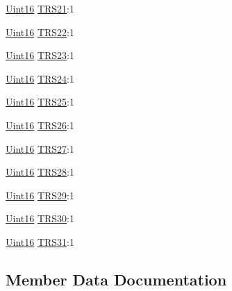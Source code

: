 \begin{DoxyCompactItemize}
\hyperlink{_d_s_p2833x___device_8h_a59a9f6be4562c327cbfb4f7e8e18f08b}{Uint16} \hyperlink{struct_c_a_n_t_r_s___b_i_t_s_a932a55c736eb8750eaab4062033aad9a}{T\+R\+S21}\+:1
\item 
\hyperlink{_d_s_p2833x___device_8h_a59a9f6be4562c327cbfb4f7e8e18f08b}{Uint16} \hyperlink{struct_c_a_n_t_r_s___b_i_t_s_aa69bfd255f8dc8a6313e5ab23f4b0dd9}{T\+R\+S22}\+:1
\item 
\hyperlink{_d_s_p2833x___device_8h_a59a9f6be4562c327cbfb4f7e8e18f08b}{Uint16} \hyperlink{struct_c_a_n_t_r_s___b_i_t_s_adc34f962ed50e72ec6b273cd4459cc97}{T\+R\+S23}\+:1
\item 
\hyperlink{_d_s_p2833x___device_8h_a59a9f6be4562c327cbfb4f7e8e18f08b}{Uint16} \hyperlink{struct_c_a_n_t_r_s___b_i_t_s_af81847694b5978680c72134c3ed895fb}{T\+R\+S24}\+:1
\item 
\hyperlink{_d_s_p2833x___device_8h_a59a9f6be4562c327cbfb4f7e8e18f08b}{Uint16} \hyperlink{struct_c_a_n_t_r_s___b_i_t_s_a3275ffc138b403bd683b2392a4cd89fc}{T\+R\+S25}\+:1
\item 
\hyperlink{_d_s_p2833x___device_8h_a59a9f6be4562c327cbfb4f7e8e18f08b}{Uint16} \hyperlink{struct_c_a_n_t_r_s___b_i_t_s_aebb14105fd0d23e6269c9a50606d2718}{T\+R\+S26}\+:1
\item 
\hyperlink{_d_s_p2833x___device_8h_a59a9f6be4562c327cbfb4f7e8e18f08b}{Uint16} \hyperlink{struct_c_a_n_t_r_s___b_i_t_s_ad1c32744b60f7e9fbdf845e333713246}{T\+R\+S27}\+:1
\item 
\hyperlink{_d_s_p2833x___device_8h_a59a9f6be4562c327cbfb4f7e8e18f08b}{Uint16} \hyperlink{struct_c_a_n_t_r_s___b_i_t_s_a9aabf1a417755368977f9c814aaa8e7f}{T\+R\+S28}\+:1
\item 
\hyperlink{_d_s_p2833x___device_8h_a59a9f6be4562c327cbfb4f7e8e18f08b}{Uint16} \hyperlink{struct_c_a_n_t_r_s___b_i_t_s_aa6bc136e2690058f4915cad1c32be876}{T\+R\+S29}\+:1
\item 
\hyperlink{_d_s_p2833x___device_8h_a59a9f6be4562c327cbfb4f7e8e18f08b}{Uint16} \hyperlink{struct_c_a_n_t_r_s___b_i_t_s_a6e05e64027351624a1cc1dda05819732}{T\+R\+S30}\+:1
\item 
\hyperlink{_d_s_p2833x___device_8h_a59a9f6be4562c327cbfb4f7e8e18f08b}{Uint16} \hyperlink{struct_c_a_n_t_r_s___b_i_t_s_a1a1aa18dca9461bbbe362d419ca84428}{T\+R\+S31}\+:1
\end{DoxyCompactItemize}


\subsection{Member Data Documentation}
\hypertarget{struct_c_a_n_t_r_s___b_i_t_s_ae9c884736b64b12176fc0d692aa35185}{}
